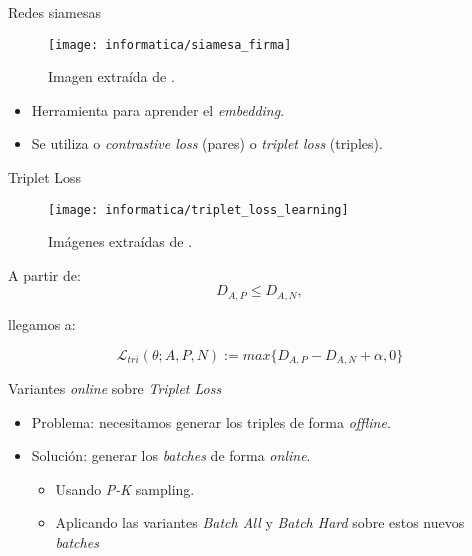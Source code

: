 \begin{frame}{Redes siamesas}

	\begin{figure}
		\texttt{[image: informatica/siamesa\_firma]}
		\caption{Imagen extraída de \cite{informatica:siamesa_web_imagen}.}
		\label{img:siamesa_firma}
	\end{figure}

	\begin{itemize}
		\item Herramienta para aprender el \textit{embedding}.
		\item Se utiliza o \textit{contrastive loss} (pares) o \textit{triplet loss} (triples).
	\end{itemize}

\end{frame}

\begin{frame}{Triplet Loss}
	\begin{figure}
		\texttt{[image: informatica/triplet\_loss\_learning]}
		\caption{Imágenes extraídas de \cite{informatica:cacd_dataset}.}
	\end{figure}

	A partir de:
	\begin{equation}
		D_{A, P} \leq D_{A, N},
	\end{equation}

	llegamos a:

	\begin{equation} \label{ieq:triplet_loss_single_entry}
		\mathcal{L}_{tri}(\theta; A, P, N) := max \{D_{A, P} - D_{A, N} + \alpha, 0 \}
	\end{equation}
\end{frame}

\begin{frame}{Variantes \textit{online} sobre \textit{Triplet Loss}}

	\begin{itemize}
		\item Problema: necesitamos generar los triples de forma \textit{offline}.
		\item Solución: generar los \textit{batches} de forma \textit{online}.
		      \begin{itemize}
			      \item Usando \textit{P-K} sampling.
			      \item Aplicando las variantes \textit{Batch All} y \textit{Batch Hard} sobre estos nuevos \textit{batches}
		      \end{itemize}
	\end{itemize}

\end{frame}

